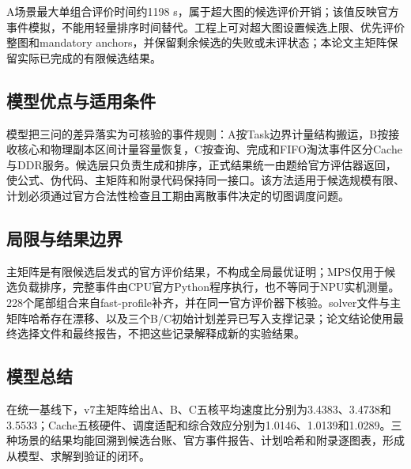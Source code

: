 A场景最大单组合评价时间约1198 s，属于超大图的候选评价开销；该值反映官方事件模拟，不能用轻量排序时间替代。工程上可对超大图设置候选上限、优先评价整图和mandatory anchors，并保留剩余候选的失败或未评状态；本论文主矩阵保留实际已完成的有限候选结果。

\subsection{模型优点与适用条件}
模型把三问的差异落实为可核验的事件规则：A按Task边界计量结构搬运，B按接收核心和物理副本区间计量容量恢复，C按查询、完成和FIFO淘汰事件区分Cache与DDR服务。候选层只负责生成和排序，正式结果统一由题给官方评估器返回，使公式、伪代码、主矩阵和附录代码保持同一接口。该方法适用于候选规模有限、计划必须通过官方合法性检查且工期由离散事件决定的切图调度问题。

\subsection{局限与结果边界}
主矩阵是有限候选启发式的官方评价结果，不构成全局最优证明；MPS仅用于候选负载排序，完整事件由CPU官方Python程序执行，也不等同于NPU实机测量。228个尾部组合来自fast-profile补齐，并在同一官方评价器下核验。solver文件与主矩阵哈希存在漂移、以及三个B/C初始计划差异已写入支撑记录；论文结论使用最终选择文件和最终报告，不把这些记录解释成新的实验结果。

\subsection{模型总结}
在统一基线下，v7主矩阵给出A、B、C五核平均速度比分别为3.4383、3.4738和3.5533；Cache五核硬件、调度适配和综合效应分别为1.0146、1.0139和1.0289。三种场景的结果均能回溯到候选台账、官方事件报告、计划哈希和附录逐图表，形成从模型、求解到验证的闭环。
